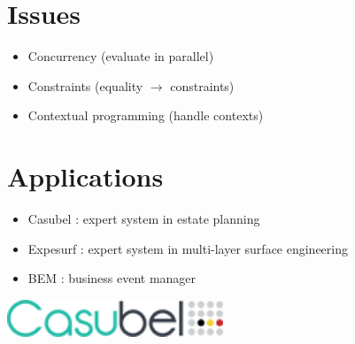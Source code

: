\documentclass[portrait,final,a0paper]{nadiposter}
\newcommand{\compresslist}{%
\setlength{\itemsep}{1pt}%
\setlength{\parskip}{0pt}%
\setlength{\parsep}{0pt}%
\setlength{\leftmargin}{0pt}%
}
\begin{document}
\begin{poster}
{\begin{multicols}{2}
\section*{Issues}


\begin{itemize}
\compresslist

\item Concurrency (evaluate in parallel)
\item Constraints (equality $\rightarrow$ constraints)
\item Contextual programming (handle contexts)

\end{itemize}

\section*{Applications}

\begin{itemize}
\compresslist

\item Casubel : expert system in estate planning
\item Expesurf : expert system in multi-layer surface engineering
\item BEM : business event manager

\end{itemize}

\bigskip
\begin{center}
\includegraphics[height=3em]{images/casubel.png}
\end{center}

\end{multicols}
}


\newcommand{\mgoal}[1]{\overline{#1}}
\newcommand{\decl}[1]{\mbox{$\; \models_{\mbox{\scriptsize {#1}}} \;$}}
\newcommand{\cl}{\mbox{$\leftarrow$}}
\newcommand{\mf}[1]{\mbox{#1}}
\newcommand{\tpd}{\mbox{$ \; \vdash \; $}}
\newcommand{\fiden}{\mbox{$\Psi_{den}$}}
\newcommand{\fip}{\mbox{$\Psi_{\parallel}$}}
\newcommand{\parop}{\mbox{ $ \tilde{\parallel} $ }}

\sectionfont{\raggedright}

\end{poster}
\end{document}
